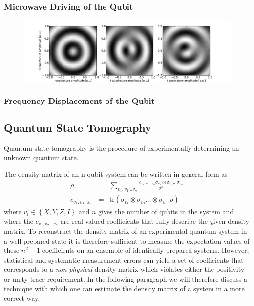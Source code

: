 
\subsubsection{Microwave Driving of the Qubit}


\begin{figure}
	\centering
		\includegraphics[width=1.\textwidth]{"./data/ct5/2010_12_01 - iq tomography/iq_tomographies"}
	\label{fig:SingleQubitIQControl}
	\caption{}
\end{figure}

\subsubsection{Frequency Displacement of the Qubit}

%
\subsection{Quantum State Tomography}

Quantum state tomography is the procedure of experimentally determining an unknown quantum state\citep{michael_a._nielsen_quantum_2000}.

The density matrix of an n-qubit system can be written in general form as
\begin{eqnarray}
\rho & = & \sum\limits_{v_1,v_2\hdots v_n} \frac{c_{v_1,v_2\hdots v_n} \sigma_{v_1}\otimes \sigma_{v_2}\hdots \sigma_{v_n}}{2^n} \label{eq:state_tomography_state_representation} \\
c_{v_1,v_2\hdots v_n} & = & \mathrm{tr}\left(\sigma_{v_1}\otimes \sigma_{v_2}\hdots \otimes\sigma_{v_n} \; \rho \right)  \label{eq:state_tomography_coefficients}
\end{eqnarray}
where $v_i \in \left\{ X,Y,Z,I\right\}$ and $n$ gives the number of qubits in the system and where the $c_{v_1,v_2\hdots v_n}$ are real-valued coefficients that fully describe the given density matrix. To reconstruct the density matrix of an experimental quantum system in a well-prepared state it is therefore sufficient to measure the expectation values of these $n^2-1$ coefficients on an ensemble of identically prepared systems. However, statistical and systematic measurement errors can yield a set of coefficients that corresponds to a {\it non-physical} density matrix which violates either the positivity or unity-trace requirement. In the following paragraph we will therefore discuss a technique with which one can estimate the density matrix of a system in a more correct way.

